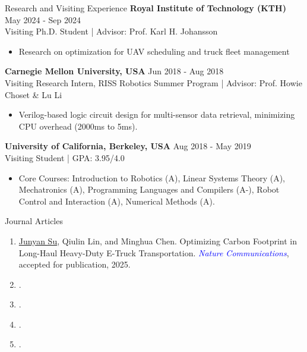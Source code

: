 \documentclass{resume} %
\begin{document}
\begin{rSection}{Research and Visiting Experience}
    \textbf{Royal Institute of Technology (KTH)} \hfill {May 2024 - Sep 2024}
    \\ Visiting Ph.D. Student | Advisor: Prof. Karl H. Johansson
    \begin{itemize}
    \item Research on optimization for UAV scheduling and truck fleet management
    \end{itemize}
    
    \textbf{Carnegie Mellon University, USA} \hfill {Jun 2018 - Aug 2018}
    \\ Visiting Research Intern, RISS Robotics Summer Program | Advisor: Prof. Howie Choset \& Lu Li
    \begin{itemize}
    \item Verilog-based logic circuit design for multi-sensor data retrieval, minimizing CPU overhead (2000ms to 5ms).
    \end{itemize}
    \textbf{University of California, Berkeley, USA} \hfill {Aug 2018 - May 2019}
    \\ Visiting Student | GPA: 3.95/4.0
    \begin{itemize}
    \item Core Courses: Introduction to Robotics (A), Linear Systems Theory (A), Mechatronics (A), Programming Languages and Compilers (A-), Robot Control and Interaction (A), Numerical Methods (A).
    \end{itemize}
\end{rSection}


\def\FormatName#1{%
    \def\myname{Junyan Su}%
    \edef\name{#1}%
    \ifx\name\myname
      \underline{#1}%
    \else
       #1%
    \fi
}

\begin{rSection}{Journal Articles}
    \begin{enumerate}
        \item \underline{Junyan Su}, Qiulin Lin, and Minghua Chen. Optimizing Carbon Footprint in Long-Haul Heavy-Duty E-Truck Transportation. \textcolor{blue}{\emph{Nature Communications}}, accepted for publication, 2025. 
        \item {}.
        \item {}.
        \item {}.
        \item {}.
    \end{enumerate}
\end{rSection}
\end{document}
